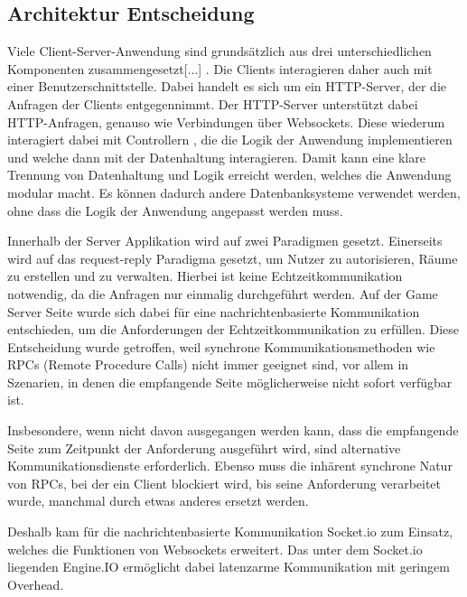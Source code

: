 \documentclass[
]{article}
\begin{document}
\hypertarget{section-achitactural-decision}{
\subsection{Architektur Entscheidung}}

\glqq Viele Client-Server-Anwendung sind grundsätzlich aus drei unterschiedlichen Komponenten zusammengesetzt[...]\grqq{} \cite[S.57 ff.]{tanenbaum2007distributed}.
Die Clients interagieren daher auch mit einer Benutzerschnittstelle. Dabei handelt es sich um ein HTTP-Server, der die Anfragen der Clients entgegennimmt.
Der HTTP-Server unterstützt dabei HTTP-Anfragen, genauso wie Verbindungen über Websockets.
Diese wiederum interagiert dabei mit \glqq Controllern \grqq{}, die die Logik der Anwendung implementieren und welche dann
mit der Datenhaltung interagieren. Damit kann eine klare Trennung von Datenhaltung und Logik erreicht werden, welches die Anwendung
modular macht. Es können dadurch andere Datenbanksysteme verwendet werden, ohne dass die Logik der Anwendung angepasst werden muss.

Innerhalb der Server Applikation wird auf zwei Paradigmen gesetzt.
Einerseits wird auf das request-reply Paradigma gesetzt, um Nutzer zu autorisieren, Räume zu erstellen und zu verwalten.
Hierbei ist keine Echtzeitkommunikation notwendig, da die Anfragen nur einmalig durchgeführt werden.
Auf der Game Server Seite wurde sich dabei für eine nachrichtenbasierte Kommunikation entschieden, 
um die Anforderungen der Echtzeitkommunikation zu erfüllen. Diese Entscheidung wurde getroffen, 
weil synchrone Kommunikationsmethoden wie RPCs (Remote Procedure Calls) nicht immer geeignet 
sind, vor allem in Szenarien, in denen die empfangende Seite möglicherweise nicht sofort 
verfügbar ist. 

\glqq Insbesondere, wenn nicht davon ausgegangen werden kann, 
dass die empfangende Seite zum Zeitpunkt der Anforderung ausgeführt wird, 
sind alternative Kommunikationsdienste erforderlich. 
Ebenso muss die inhärent synchrone Natur von RPCs, 
bei der ein Client blockiert wird, bis seine Anforderung verarbeitet wurde, 
manchmal durch etwas anderes ersetzt werden.\grqq{} \cite[S. 140 ff.]{tanenbaum2007distributed}

Deshalb kam für die nachrichtenbasierte Kommunikation Socket.io zum Einsatz,
welches die Funktionen von Websockets erweitert.
Das unter dem Socket.io liegenden Engine.IO ermöglicht dabei latenzarme Kommunikation
mit geringem Overhead.\cite[]{engine-io-protocol}
\end{document}
